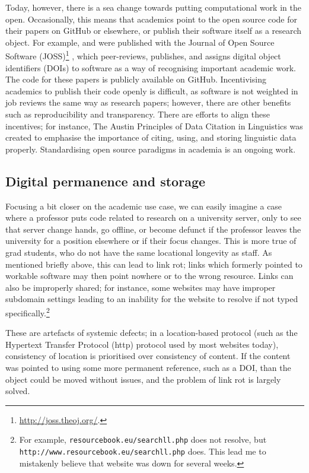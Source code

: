 Today, however, there is a sea change towards putting computational work in the open. Occasionally, this means that academics point to the open source code for their papers on GitHub or elsewhere, or publish their software itself as a research object. For example, \citet{makela2016integrated} and \citet{kleinberg2017web} were published with the Journal of Open Source Software (JOSS)\footnote{\href{http://joss.theoj.org/}{http://joss.theoj.org/}. } \citep{smith2018journal}, which peer-reviews, publishes, and assigns digital object identifiers (DOIs) to software as a way of recognising important academic work. The code for these papers is publicly available on GitHub. Incentivising academics to publish their code openly is difficult, as software is not weighted in job reviews the same way as research papers; however, there are other benefits such as reproducibility and transparency. There are efforts to align these incentives; for instance, The Austin Principles of Data Citation in Linguistics \citep{AustinPrinciples2017} was created to emphasise the importance of citing, using, and storing linguistic data properly. Standardising open source paradigms in academia is an ongoing work.

\subsection{Digital permanence and storage}
\label{subsec:digital-permanence}

Focusing a bit closer on the academic use case, we can easily imagine a case where a professor puts code related to research on a university server, only to see that server change hands, go offline, or become defunct if the professor leaves the university for a position elsewhere or if their focus changes. This is more true of grad students, who do not have the same locational longevity as staff. As mentioned briefly above, this can lead to link rot; links which formerly pointed to workable software may then point nowhere or to the wrong resource. Links can also be improperly shared; for instance, some websites may have improper subdomain settings leading to an inability for the website to resolve if not typed specifically.\footnote{For example, {\tt resourcebook.eu/searchll.php} does not resolve, but {\tt http://www.resourcebook.eu/searchll.php} does. This lead me to mistakenly believe that  website was down for several weeks.}

These are artefacts of systemic defects; in a location-based protocol (such as the Hypertext Transfer Protocol (http) protocol used by most websites today), consistency of location is prioritised over consistency of content. If the content was pointed to using some more permanent reference, such as a DOI, than the object could be moved without issues, and the problem of link rot is largely solved.

